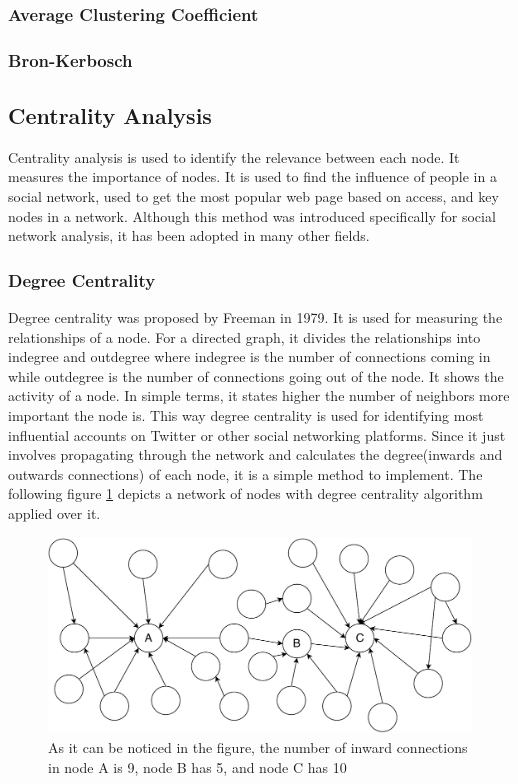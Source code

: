 \documentclass[journal,twoside,web]{ieeecolor}
\begin{document}
\subsubsection{Average Clustering Coefficient}
\subsubsection{Bron-Kerbosch}

\subsection{Centrality Analysis}
Centrality analysis is used to identify the relevance between each node. It measures the importance of nodes. It is used to find the influence of people in a social network, used to get the most popular web page based on access, and key nodes in a network. Although this method was introduced specifically for social network analysis, it has been adopted in many other fields.

\subsubsection{Degree Centrality}
Degree centrality was proposed by Freeman in 1979\cite{25}. It is used for measuring the relationships of a node. For a directed graph, it divides the relationships into indegree and outdegree where indegree is the number of connections coming in while outdegree is the number of connections going out of the node. It shows the activity of a node. In simple terms, it states higher the number of neighbors more important the node is. This way degree centrality is used for identifying most influential accounts on Twitter or other social networking platforms. Since it just involves propagating through the network and calculates the degree(inwards and outwards connections) of each node, it is a simple method to implement. The following figure \ref{fig8} depicts a network of nodes with degree centrality algorithm applied over it.

\begin{figure}[!h]
    \centerline{\includegraphics[scale=0.45]{figures/degree_centrality.pdf}}
    \caption{As it can be noticed in the figure, the number of inward connections in node A is 9, node B has 5, and node C has 10}
    \label{fig8}
\end{figure}
\end{document}
